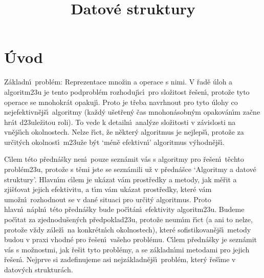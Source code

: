 \documentclass[a4paper,12pt]{article}
\begin{document}
     

\newtheorem*{dusledek}{Důsledek}
\newtheorem*{lemma}{Lemma}
\newtheorem*{veta}{Věta}
\newtheorem*{tvrzeni}{Tvrzení}

\def \emph#1{\underbar{#1}}
\def \Prob{\operatorname{Prob}}
\def \var{\operatorname{var}}

\title{Datové struktury}
\date{}
\maketitle

\section{Úvod}

\flushpar Z\'akladn\'\i\ probl\'em: Reprezentace mno\v zin a 
operace s nimi. V \v rad\v e \'uloh a algoritm\accent23u je tento 
podprobl\'em rozhoduj\'\i c\'\i\ pro slo\v zitost \v re\v sen\'\i , proto\v ze 
tyto operace se mnohokr\'at opakuj\'\i . Proto je t\v reba 
navrhnout pro tyto \'ulohy co nejefektivn\v ej\v s\'\i\ algoritmy 
(ka\v zd\'y u\v set\v ren\'y \v cas mnohon\'asobn\'ym opakov\'an\'\i m za\v cne 
hr\'at d\accent23ule\v zitou roli). To vede k detailn\'\i\ 
anal\'yze slo\v zitosti v z\'avislosti na vn\v ej\v s\'\i ch okolnostech. 
Nelze \v r\'\i ct, 
\v ze n\v ekter\'y algoritmus je nejlep\v s\'\i , proto\v ze za ur\v cit\'ych 
okolnost\'\i\ m\accent23u\v ze b\'yt `m\'en\v e efektivn\'\i ' algoritmus 
v\'yhodn\v ej\v s\'\i .
\medskip

\flushpar C\'\i lem t\'eto p\v redn\'a\v sky nen\'\i\ pouze sezn\'amit v\'as s algoritmy 
pro \v re\v sen\'\i\ t\v echto probl\'em\accent23u, proto\v ze s t\v emi jste se 
sezn\'amili u\v z v p\v redn\'a\v sce `Algoritmy a datov\'e struktury'. Hlavn\'\i m c\'\i lem 
je uk\'azat v\'am prost\v redky a metody, jak m\v e\v rit a zji\v s\v tovat 
jejich efektivitu, a t\'\i m v\'am uk\'azat prost\v red\-ky, kter\'e v\'am 
umo\v zn\'\i\ rozhodnout se v dan\'e situaci pro ur\v cit\'y algoritmus. 
Proto hlavn\'\i\ n\'apln\'\i\ t\'eto p\v redn\'a\v sky bude po\v c\'\i t\'an\'\i\ efektivity 
algoritm\accent23u. Budeme po\v c\'\i tat za 
zjednodu\v se\-n\'ych 
p\v redpoklad\accent23u, proto\v ze neum\'\i m \v r\'\i ct (a ani to nelze, proto\v ze v\v zdy z\'ale\v z\'\i\ 
na konkr\'etn\'\i ch okolnostech), kter\'e sofistikovan\v ej\v s\'\i\ metody 
budou v praxi vhodn\'e pro \v re\v sen\'\i\ va\v seho probl\'emu. C\'\i lem p\v redn\'a\v sky je 
sezn\'amit v\'as s mo\v znostmi, jak \v re\v sit tyto probl\'emy, a se z\'akladn\'\i mi 
metodami pro jejich \v re\v sen\'\i . Nejprve si zadefinujeme asi 
nejz\'akladn\v ej\v s\'\i\ probl\'em, kter\'y \v re\v s\'\i me v datov\'ych struktur\'ach. 
\medskip
\end{document}
